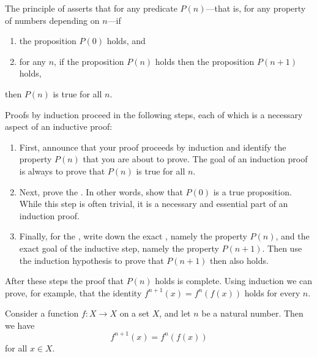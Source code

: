 \begin{definition}
  The principle of  asserts that for any predicate $P(n)$---that is, for any property of numbers depending on $n$---if
  \begin{enumerate}
  \item the proposition $P(0)$ holds, and
  \item for any $n$, if the proposition $P(n)$ holds then the proposition $P(n+1)$ holds,
  \end{enumerate}
  then $P(n)$ is true for all $n$.
\end{definition}

\begin{remark}
  Proofs by induction proceed in the following steps, each of which is a necessary aspect of an inductive proof:
  \begin{enumerate}
  \item First, announce that your proof proceeds by induction and identify the property $P(n)$ that you are about to prove. The goal of an induction proof is always to prove that $P(n)$ is true for all $n$.
  \item Next, prove the . In other words, show that $P(0)$ is a true proposition. While this step is often trivial, it is a necessary and essential part of an induction proof.
  \item Finally, for the , write down the exact , namely the property $P(n)$, and the exact goal of the inductive step, namely the property $P(n+1)$. Then use the induction hypothesis to prove that $P(n+1)$ then also holds.
  \end{enumerate}
  After these steps the proof that $P(n)$ holds is complete. Using induction we can prove, for example, that the identity $f^{n+1}(x)=f^n(f(x))$ holds for every $n$.  
\end{remark}

\begin{proposition}\label{proposition:iterate-successor}
  Consider a function $f:X\to X$ on a set $X$, and let $n$ be a natural number. Then we have
  \begin{equation*}
    f^{n+1}(x) = f^n(f(x))
  \end{equation*}
  for all $x\in X$.
\end{proposition}

